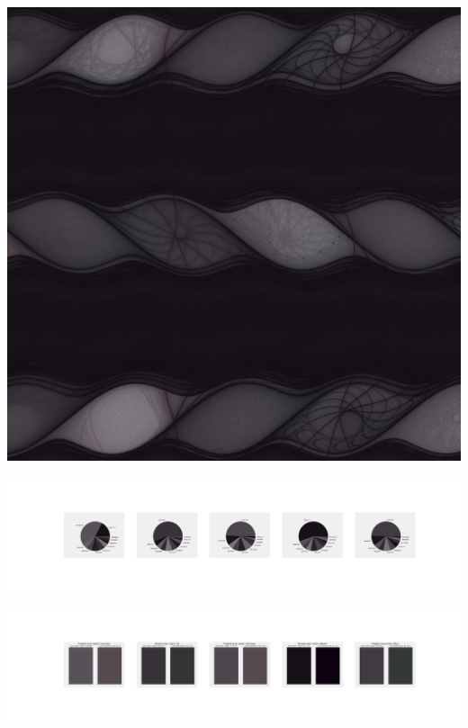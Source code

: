 \documentclass[11pt]{article}
\begin{document}
\begin{landscape}
    \begin{center}
    \includegraphics[width=\textwidth]{./nbimg/file (409).jpg}
    \end{center}

    \begin{center}
    \includegraphics[width=250mm]{./nbimg/pie-344.jpg}
    \end{center}

    \begin{center}
    \includegraphics[width=250mm]{./nbimg/peak-344.jpg}
    \end{center}
    


\end{landscape}
\end{document}
